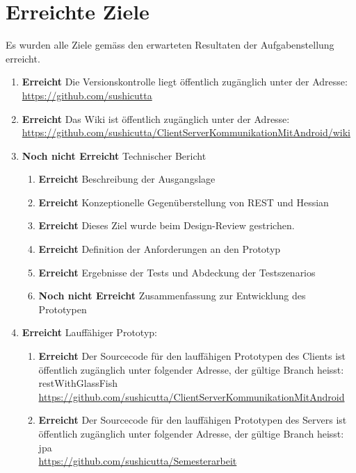 \documentclass[abstracton, listof=totocnumbered,
bibliography=totocnumbered]{scrreprt}
\begin{document}
  \newpage  
  
  \chapter{Erreichte Ziele}
  
  Es wurden alle Ziele gemäss den erwarteten Resultaten der Aufgabenstellung
  erreicht.
  
  \begin{enumerate}
    \item \textbf{Erreicht} Die Versionskontrolle liegt öffentlich zugänglich unter der
          Adresse:\\
          \url{https://github.com/sushicutta}
    \item \textbf{Erreicht} Das Wiki ist öffentlich zugänglich unter der
          Adresse:\\
          \url{https://github.com/sushicutta/ClientServerKommunikationMitAndroid/wiki}
    \item \textbf{Noch nicht Erreicht} Technischer Bericht
    \begin{enumerate}
      \item \textbf{Erreicht} Beschreibung der Ausgangslage
      \item \textbf{Erreicht} Konzeptionelle Gegenüberstellung von \ac{REST} und
            Hessian
      \item \textbf{Erreicht} Dieses Ziel wurde beim Design-Review gestrichen. 
      \item \textbf{Erreicht} Definition der Anforderungen an den Prototyp
      \item \textbf{Erreicht} Ergebnisse der Tests und Abdeckung der Testszenarios
      \item \textbf{Noch nicht Erreicht} Zusammenfassung zur Entwicklung des
            Prototypen
    \end{enumerate}
    \item \textbf{Erreicht} Lauffähiger Prototyp:
    \begin{enumerate}
      \item \textbf{Erreicht} Der Sourcecode für den lauffähigen Prototypen des
      Clients ist öffentlich zugänglich unter folgender Adresse, der gültige Branch
      heisst: restWithGlassFish\\
      \url{https://github.com/sushicutta/ClientServerKommunikationMitAndroid}
      \item \textbf{Erreicht} Der Sourcecode für den lauffähigen Prototypen des
      Servers ist öffentlich zugänglich unter folgender Adresse, der gültige Branch
      heisst: jpa\\
      \url{https://github.com/sushicutta/Semesterarbeit}
    \end{enumerate}
  \end{enumerate}
  
\end{document}

